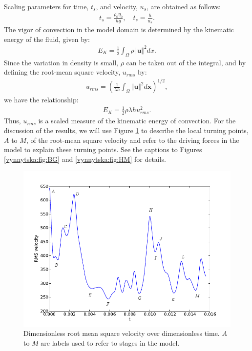 Scaling parameters for time, $t_s$, and velocity, $u_s$, are obtained
as follows:
\begin{align}
 \label{vynnytska:eq:velsc}
 t_s = \frac{\rho_0 \eta_0}{h g}, \quad t_s = \frac{h}{u_s}.
\end{align}
The vigor of convection in the model domain is determined by the
kinematic energy of the fluid, given by:
\begin{align}
\label{vynnytska:eq:KE}
E_{K} = \frac{1}{2}\int_{\Omega}\rho \Vert \bm{u} \Vert^{2}dx.
\end{align}
Since the variation in density is small, $\rho$ can be taken out of
the integral, and by defining the root-mean square velocity, $u_{rms}$
by:
\begin{align}
\label{vynnytska:eq:u_rms}
u_{rms} =\left( \frac{1}{\lambda h} \int_{\Omega} \Vert \bm{u} \Vert^{2} d\bm{x}  \right)^{1/2},
\end{align}
we have the relationship:
\begin{align}
  \label{vynnytska:eq:KEu_rms}
  E_{K} = \frac{1}{2} \rho \lambda h u_{rms}^{2}.
\end{align}
Thus, $u_{rms}$ is a scaled measure of the kinematic energy of
convection. For the discussion of the results, we will use Figure
\ref{vynnytska:fig:rms_velocity} to describe the local turning points,
$A$ to $M$, of the root-mean square velocity and refer to the driving
forces in the model to explain these turning points. See the captions
to Figures \ref{vynnytska:fig:BG} and \ref{vynnytska:fig:HM} for
details.

\begin{figure}[htbp]
  \begin{center}
   \includegraphics[width=0.95\columnwidth]{chapters/vynnytska/figures/rms_velocity.png}
    \caption{Dimensionless root mean square velocity over
    dimensionless time. $A$ to $M$ are labels used to refer to stages
    in the model.}
  \end{center}
\label{vynnytska:fig:rms_velocity}
\end{figure}

